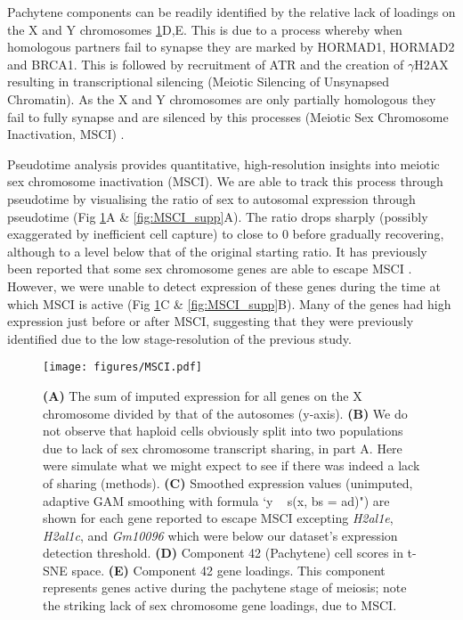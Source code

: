 Pachytene components can be readily identified by the relative lack of loadings on the X and Y chromosomes \ref{fig:MSCI}D,E. This is due to a process whereby when homologous partners fail to synapse they are marked by HORMAD1, HORMAD2 and BRCA1. This is followed by recruitment of ATR and the creation of $\gamma$H2AX resulting in transcriptional silencing (Meiotic Silencing of Unsynapsed Chromatin). As the X and Y chromosomes are only partially homologous they fail to fully synapse and are silenced by this processes (Meiotic Sex Chromosome Inactivation, MSCI) \parencite{Turner2007Meiotic, Turner2015Meiotic}.

Pseudotime analysis provides quantitative, high-resolution insights into meiotic sex chromosome inactivation (MSCI). We are able to track this process through pseudotime by visualising the ratio of sex to autosomal expression through pseudotime (Fig \ref{fig:MSCI}A \& \ref{fig:MSCI_supp}A). The ratio drops sharply (possibly exaggerated by inefficient cell capture) to close to 0 before gradually recovering, although to a level below that of the original starting ratio. It has previously been reported that some sex chromosome genes are able to escape MSCI \parencite{daCruz2016Transcriptome, Soumillon2013Cellular}. However, we were unable to detect expression of these genes during the time at which MSCI is active (Fig \ref{fig:MSCI}C \& \ref{fig:MSCI_supp}B). Many of the genes had high expression just before or after MSCI, suggesting that they were previously identified due to the low stage-resolution of the previous study. 

\begin{figure}[H]
	\centering
	\texttt{[image: figures/MSCI.pdf]}
	\caption{
		\textbf{(A)} The sum of imputed expression for all genes on the X chromosome divided by that of the autosomes (y-axis).
		\textbf{(B)} We do not observe that haploid cells obviously split into two populations due to lack of sex chromosome transcript sharing, in part A. Here were simulate what we might expect to see if there was indeed a lack of sharing (methods).
		\textbf{(C)} Smoothed expression values (unimputed, adaptive GAM smoothing with formula ‘y ~ s(x, bs = ad)") are shown for each gene reported to escape MSCI \parencite{daCruz2016Transcriptome} excepting \textit{H2al1e}, \textit{H2al1c}, and \textit{Gm10096} which were below our dataset's expression detection threshold.
		\textbf{(D)} Component 42 (Pachytene) cell scores in t-SNE space.
		\textbf{(E)} Component 42 gene loadings. This component represents genes active during the pachytene stage of meiosis; note the striking lack of sex chromosome gene loadings, due to MSCI.
	}
	\label{fig:MSCI}
\end{figure}

